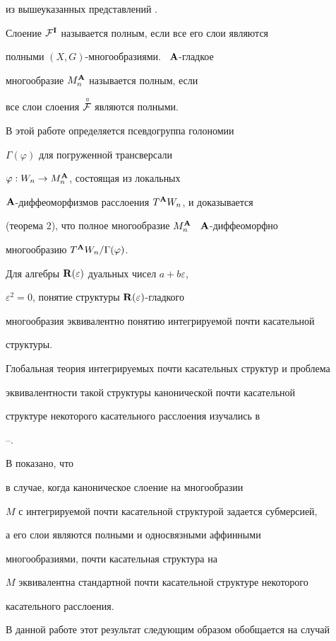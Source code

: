 из вышеуказанных представлений \cite{VSh3}.


Слоение ${\cal F}^{\bold I}$ называется полным, если все его слои являются


полными $(X,G)$-многообразиями. \ ${\bold A}$-гладкое 


многообразие $M^{\bold A}_n$ называется полным, если


все слои слоения $\overset{\,\circ}{\cal F}{}$ являются полными.


В этой работе определяется псевдогруппа голономии


$\Gamma(\varphi)$ для погруженной трансверсали


$\varphi: W_n\to M^{\bold A}_n$, состоящая из локальных


${\bold A}$-диффеоморфизмов расслоения $T^{{\bold A}}W_n$, и доказывается


(теорема 2), что полное многообразие $M^{\bold A}_n$ \ ${\bold A}$-диффеоморфно


многообразию $T^{{\bold A}}W_n/\Gamma(\varphi)$.


 


Для алгебры ${\bold R}(\varepsilon)$ дуальных чисел $a+b\varepsilon$,


$\varepsilon^2=0$, понятие структуры ${\bold R}(\varepsilon)$-гладкого


многообразия эквивалентно понятию интегрируемой почти касательной


структуры.


Глобальная теория интегрируемых почти касательных структур и проблема


эквивалентности такой структуры канонической почти касательной


структуре некоторого касательного расслоения изучались в 


\cite{Br-Cl}--\cite{Mal2}.


В \cite{Cr-T} показано, что


в случае, когда каноническое слоение на многообразии


$M$ с интегрируемой почти касательной структурой задается субмерсией,


а его слои являются полными и односвязными аффинными


многообразиями, почти касательная структура на


$M$ эквивалентна стандартной почти касательной структуре некоторого


касательного расслоения.


В данной работе этот результат следующим образом обобщается на случай



